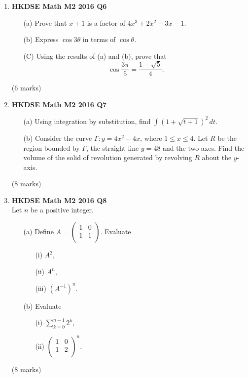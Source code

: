 \documentclass{report}
\begin{document}
\begin{enumerate}
	\newpage

	\item \textbf{HKDSE Math M2 2016 Q6}
	\begin{enumerate}
		\item [(a)]Prove that $x+1$ is a factor of $4x^3+2x^2-3x-1$. 
		\item [(b)]Express $\cos{3\theta}$ in terms of $\cos{\theta}$.
		\item [(C)]Using the results of (a) and (b), prove that $$\cos{\displaystyle\frac{3\pi}{5}} = \displaystyle\frac{1-\sqrt{5}}{4}.$$
	\end{enumerate}
	(6 marks)

	\item \textbf{HKDSE Math M2 2016 Q7}
	\begin{enumerate}
		\item [(a)]Using integration by substitution, find $\displaystyle\int (1+\sqrt{t+1})^2 \,dt$. 
		\item [(b)]Consider the curve $\Gamma : y = 4x^2 - 4x$, where $1 \leq x \leq 4$. Let $R$ be the region bounded by $\Gamma$, the straight line $y=48$ and the two axes. Find the volume of the solid of revolution generated by revolving $R$ about the $y$-axis.
	\end{enumerate}
	(8 marks)

	\item \textbf{HKDSE Math M2 2016 Q8}\\
	Let $n$ be a positive integer.
	\begin{enumerate}
		\item [(a)]Define $A = 
		\begin{pmatrix}
			1&0\\1&1\\
		\end{pmatrix}$. Evaluate 
		\begin{enumerate}
			\item [(i)]$A^2$, 
			\item [(ii)]$A^n$,
			\item [(iii)]$(A^{-1})^n$.
		\end{enumerate}
		\item [(b)]Evaluate
		\begin{enumerate}
			\item [(i)]$\displaystyle\sum_{k=0}^{n-1} 2^k$,
			\item [(ii)]$\begin{pmatrix}
				1&0\\1&2\\
			\end{pmatrix} ^n$.
		\end{enumerate}
	\end{enumerate}
	(8 marks)


\end{enumerate}
\end{document}
